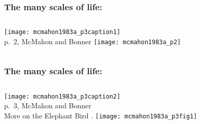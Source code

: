 \begin{frame}[plain]
  \frametitle{The many scales of life:}

  \begin{block}{}
    \begin{columns}
      \texttt{[image: mcmahon1983a\_p3caption1]}\\
      {\small p.\ 2, McMahon and Bonner\cite{mcmahon1983a}}
      \texttt{[image: mcmahon1983a\_p2]}
    \end{columns}
  \end{block}

\end{frame}


\begin{frame}[plain]
  \frametitle{The many scales of life:}

  \begin{block}{}
    \begin{columns}
      \texttt{[image: mcmahon1983a\_p3caption2]}\\
      \small p.\ 3, McMahon and Bonner\cite{mcmahon1983a}
      \\
      \small
      More on the Elephant Bird .
      \texttt{[image: mcmahon1983a\_p3fig1]}
    \end{columns}
  \end{block}

\end{frame}


